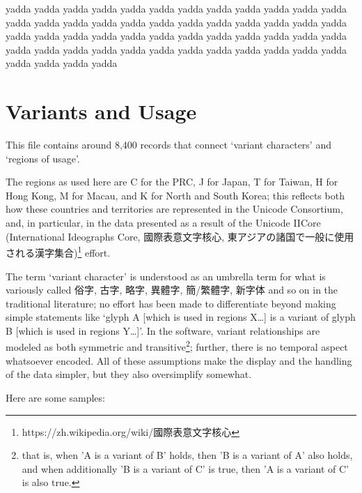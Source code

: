 \begin{multicols}{2}
\endgroup{}{}

\endgroup{}yadda yadda yadda yadda yadda yadda yadda yadda yadda yadda yadda yadda yadda
yadda yadda yadda yadda yadda yadda yadda yadda yadda yadda yadda yadda yadda
yadda yadda yadda yadda yadda yadda yadda yadda yadda yadda yadda yadda yadda
yadda yadda yadda yadda yadda yadda yadda yadda yadda yadda yadda yadda yadda\mktsShowpar\par
\null\newpage{}\end{multicols}
\section{Variants and Usage
}
\begin{multicols}{2}This file contains around 8,400 records that connect ‘variant characters’
and ‘regions of usage’.\mktsShowpar\par
The regions as used here are {\mktsStyleCode{}C} for the PRC,
{\mktsStyleCode{}J} for Japan, {\mktsStyleCode{}T} for Taiwan, {\mktsStyleCode{}H} for Hong Kong, {\mktsStyleCode{}M} for Macau, and
{\mktsStyleCode{}K} for North and South Korea; this reflects both how these countries
and territories are represented in the Unicode Consortium, and, in
particular, in the data presented as a result of the Unicode
IICore (International Ideographs Core, {\cjk{}國際表意文字核心},
{\cjk{}東{\ka{}アジア}{\hi{}の}諸国{\hi{}で}一般{\hi{}に}使用{\hi{}される}漢字集合})\footnote{https://zh.wikipedia.org/wiki/{\cjk{}國際表意文字核心}}
effort.\mktsShowpar\par
The term ‘variant character’ is understood as an umbrella term
for what is variously called {\cjk{}俗字}, {\cjk{}古字}, {\cjk{}略字}, {\cjk{}異體字}, {\cjk{}簡}/{\cjk{}繁體字}, {\cjk{}新字体}
and so on in the traditional literature; no effort has been made
to differentiate beyond making simple statements like ‘glyph A
[which is used in regions X…] is a variant of glyph B [which is used
in regions Y…]’. In the software, variant relationships are
modeled as both symmetric and
transitive\footnote{that is, when 'A is a variant of B' holds, then
'B is a variant of A' also holds, and when additionally 'B is a variant of C'
is true, then 'A is a variant of C' is also true.}; further, there
is no temporal aspect whatsoever encoded. All of these assumptions
make the display and the handling of the data simpler, but they
also oversimplify somewhat.\mktsShowpar\par
Here are some samples:\mktsShowpar\par
\begingroup\mktsObeyAllLines{}


\end{multicols}
